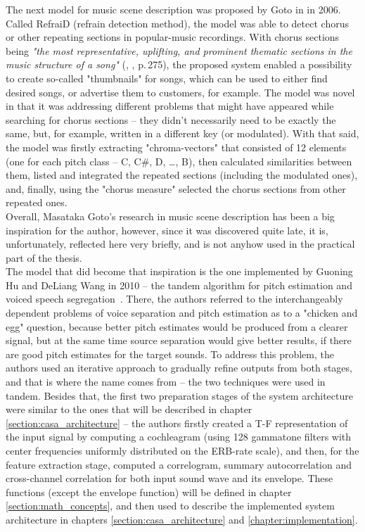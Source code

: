 The next model for music scene description was proposed by Goto in \cite{Goto2006} in 2006. Called \mbox{RefraiD} (refrain detection method), the model was able to detect chorus or other repeating sections in popular-music recordings. With chorus sections being \textit{"the most representative, uplifting, and prominent thematic sections in the music structure of a song"} (\cite{Goto2006}, \cite{Wang2006}, p.\,275), the proposed system enabled a possibility to create so-called "thumbnails" for songs, which can be used to either find desired songs, or advertise them to customers, for example. The model was novel in that it was addressing different problems that might have appeared while searching for chorus sections -- they didn't necessarily need to be exactly the same, but, for example, written in a different key (or modulated). With that said, the model was firstly extracting "chroma-vectors" that consisted of 12 elements (one for each pitch class -- C, C\#, D, \dots{}, B), then calculated similarities between them, listed and integrated the repeated sections (including the modulated ones), and, finally, using the "chorus measure" selected the chorus sections from other repeated ones.\\

Overall, Masataka Goto's research in music scene description has been a big inspiration for the author, however, since it was discovered quite late, it is, unfortunately, reflected here very briefly, and is not anyhow used in the practical part of the thesis.\\

The model that did become that inspiration is the one implemented by Guoning Hu and DeLiang Wang in 2010 -- the tandem algorithm for pitch estimation and voiced speech seg\-re\-ga\-tion~\cite{Hu2010}. There, the authors referred to the interchangeably dependent problems of voice separation and pitch estimation as to a "chicken and egg" question, because better pitch estimates would be produced from a clearer signal, but at the same time source separation would give better results, if there are good pitch estimates for the target sounds. To address this problem, the authors used an iterative approach to gradually refine outputs from both stages, and that is where the name comes from -- the two techniques were used in tandem. Besides that, the first two preparation stages of the system architecture were similar to the ones that will be described in chapter \ref{section:casa_architecture} -- the authors firstly created a T-F representation of the input signal by computing a cochleagram (using 128 gammatone filters with center frequencies uniformly distributed on the ERB-rate scale), and then, for the feature extraction stage, computed a correlogram, summary autocorrelation and cross-channel correlation for both input sound wave and its envelope. These functions (except the envelope function) will be defined in chapter \ref{section:math_concepts}, and then used to describe the implemented system architecture in chapters \ref{section:casa_architecture} and \ref{chapter:implementation}.\\


